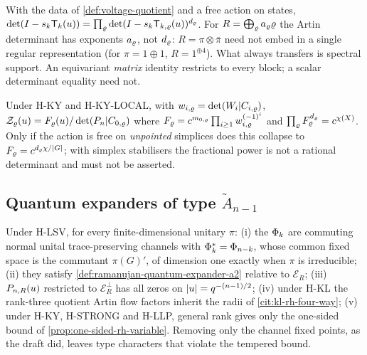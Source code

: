 \begin{theorem}
\label{thm:artin-voltage-decomposition}
With the data of \cref{def:voltage-quotient} and a free action on states,
$\det(I-s_k\mathsf T_k(u)) = \prod_{\varrho}
\det(I-s_k\mathsf T_{k,\varrho}(u))^{d_\varrho}$. For
$R = \bigoplus_\varrho a_\varrho\varrho$ the Artin determinant has exponents
$a_\varrho$, not $d_\varrho$: $R = \pi\otimes\bar\pi$ need not embed in a single
regular representation (for $\pi = 1\oplus1$, $R = 1^{\oplus4}$). What always
transfers is spectral support. An equivariant \emph{matrix} identity restricts
to every block; a scalar determinant equality need not.
\end{theorem}

\begin{theorem}
\label{thm:euler-block-bookkeeping}
Under H-KY and H-KY-LOCAL, with $w_{i,\varrho} = \det(W_i|C_{i,\varrho})$,
$\mathcal Z_\varrho(u) = F_\varrho(u)/\det(P_n|C_{0,\varrho})$ where
$F_\varrho = c^{m_{0,\varrho}}\prod_{i\ge1}w_{i,\varrho}^{(-1)^i}$ and
$\prod_\varrho F_\varrho^{d_\varrho} = c^{\chi(X)}$. Only if the action is free
on \emph{unpointed} simplices does this collapse to
$F_\varrho = c^{d_\varrho\chi/|G|}$; with simplex stabilisers the fractional
power is not a rational determinant and must not be asserted.
\end{theorem}

\subsection{Quantum expanders of type $\tilde A_{n-1}$}
\begin{theorem}
\label{thm:quantum-vertex-transfer}
Under H-LSV, for every finite-dimensional unitary $\pi$: (i) the $\Phi_k$ are
commuting normal unital trace-preserving channels with $\Phi_k^* =
\Phi_{n-k}$, whose common fixed space is the commutant $\pi(G)'$, of dimension
one exactly when $\pi$ is irreducible; (ii) they satisfy
\cref{def:ramanujan-quantum-expander-a2} relative to $\mathcal E_R$; (iii)
$P_{n,R}(u)$ restricted to $\mathcal E_R^{\perp}$ has all zeros on
$|u| = q^{-(n-1)/2}$; (iv) under H-KL the rank-three quotient Artin flow
factors inherit the radii of \cref{cit:kl-rh-four-way}; (v) under H-KY, H-STRONG
and H-LLP, general rank gives only the one-sided bound of
\cref{prop:one-sided-rh-variable}. Removing only the channel fixed points, as
the draft did, leaves type characters that violate the tempered bound.
\end{theorem}

